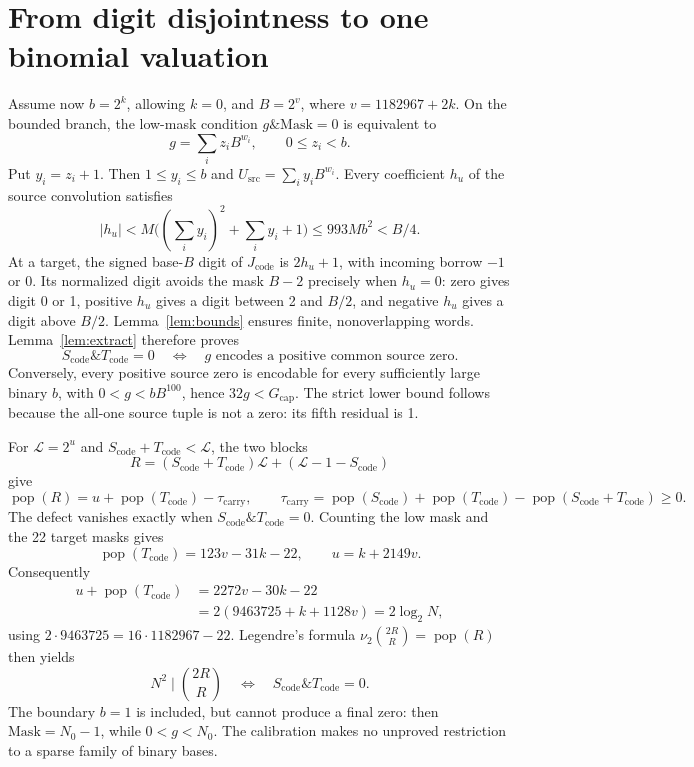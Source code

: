 \documentclass[11pt,a4paper]{article}
\theoremstyle{remark}
\newcommand{\pop}{\operatorname{pop}}
\newcommand{\Sc}{S_{\mathrm{code}}}
\newcommand{\Tc}{T_{\mathrm{code}}}
\newcommand{\Us}{U_{\mathrm{src}}}
\newcommand{\Gcap}{G_{\mathrm{cap}}}
\begin{document}
\section{From digit disjointness to one binomial valuation}
\label{sec:binary}

Assume now \(b=2^k\), allowing \(k=0\), and \(B=2^v\), where
\(v=1182967+2k\). On the bounded branch, the low-mask condition
\(g\mathbin{\&}\mathrm{Mask}=0\) is equivalent to
\[
 g=\sum_i z_iB^{w_i},\qquad 0\le z_i<b.
\]
Put \(y_i=z_i+1\). Then \(1\le y_i\le b\) and
\(\Us=\sum_i y_iB^{w_i}\).
Every coefficient \(h_u\) of the source convolution satisfies
\[
 |h_u|<M\bigl((\sum_i y_i)^2+\sum_i y_i+1\bigr)
       \le993Mb^2<B/4.
\]
At a target, the signed base-\(B\) digit of \(J_{\mathrm{code}}\)
is \(2h_u+1\), with incoming borrow \(-1\) or \(0\).
Its normalized digit avoids the mask \(B-2\) precisely when
\(h_u=0\): zero gives digit 0 or 1, positive \(h_u\) gives a digit
between 2 and \(B/2\), and negative \(h_u\) gives a digit above \(B/2\).
Lemma~\ref{lem:bounds} ensures finite, nonoverlapping words.
Lemma~\ref{lem:extract} therefore proves
\begin{equation}
 \Sc\mathbin{\&}\Tc=0
 \quad\Longleftrightarrow\quad
 g\text{ encodes a positive common source zero}.
\label{eq:decode}
\end{equation}
Conversely, every positive source zero is encodable for every
sufficiently large binary \(b\), with \(0<g<bB^{100}\), hence
\(32g<\Gcap\). The strict lower bound follows because the all-one
source tuple is not a zero: its fifth residual is 1.

For \(\mathcal L=2^u\) and \(\Sc+\Tc<\mathcal L\), the two blocks
\[
 R=(\Sc+\Tc)\mathcal L+(\mathcal L-1-\Sc)
\]
give
\[
 \pop(R)=u+\pop(\Tc)-\tau_{\mathrm{carry}},\qquad
 \tau_{\mathrm{carry}}
 =\pop(\Sc)+\pop(\Tc)-\pop(\Sc+\Tc)\ge0.
\]
The defect vanishes exactly when \(\Sc\mathbin{\&}\Tc=0\).
Counting the low mask and the 22 target masks gives
\[
 \pop(\Tc)=123v-31k-22,\qquad u=k+2149v.
\]
Consequently
\begin{align*}
 u+\pop(\Tc)&=2272v-30k-22\\
 &=2(9463725+k+1128v)=2\log_2N,
\end{align*}
using \(2\cdot9463725=16\cdot1182967-22\).
Legendre's formula
\(\nu_2\binom{2R}{R}=\pop(R)\) then yields
\begin{equation}
 N^2\mid\binom{2R}{R}
 \quad\Longleftrightarrow\quad\Sc\mathbin{\&}\Tc=0.
\label{eq:binomial}
\end{equation}
The boundary \(b=1\) is included, but cannot produce a final zero:
then \(\mathrm{Mask}=N_0-1\), while \(0<g<N_0\).
The calibration makes no unproved restriction to a sparse family
of binary bases.
\end{document}

